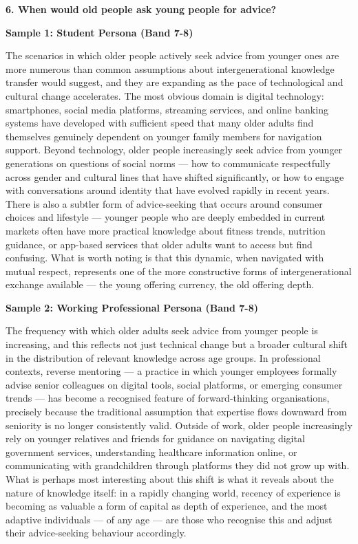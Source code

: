 \separator

\begin{ieltsquestion}
\textbf{6. When would old people ask young people for advice?}
\end{ieltsquestion}
\textbf{Sample 1: Student Persona (Band 7-8)}

The scenarios in which older people actively seek advice from younger ones are more numerous than common assumptions about intergenerational knowledge transfer would suggest, and they are expanding as the pace of technological and cultural change accelerates. The most obvious domain is digital technology: smartphones, social media platforms, streaming services, and online banking systems have developed with sufficient speed that many older adults find themselves genuinely dependent on younger family members for navigation support. Beyond technology, older people increasingly seek advice from younger generations on questions of social norms — how to communicate respectfully across gender and cultural lines that have shifted significantly, or how to engage with conversations around identity that have evolved rapidly in recent years. There is also a subtler form of advice-seeking that occurs around consumer choices and lifestyle — younger people who are deeply embedded in current markets often have more practical knowledge about fitness trends, nutrition guidance, or app-based services that older adults want to access but find confusing. What is worth noting is that this dynamic, when navigated with mutual respect, represents one of the more constructive forms of intergenerational exchange available — the young offering currency, the old offering depth.

\textbf{Sample 2: Working Professional Persona (Band 7-8)}

The frequency with which older adults seek advice from younger people is increasing, and this reflects not just technical change but a broader cultural shift in the distribution of relevant knowledge across age groups. In professional contexts, reverse mentoring — a practice in which younger employees formally advise senior colleagues on digital tools, social platforms, or emerging consumer trends — has become a recognised feature of forward-thinking organisations, precisely because the traditional assumption that expertise flows downward from seniority is no longer consistently valid. Outside of work, older people increasingly rely on younger relatives and friends for guidance on navigating digital government services, understanding healthcare information online, or communicating with grandchildren through platforms they did not grow up with. What is perhaps most interesting about this shift is what it reveals about the nature of knowledge itself: in a rapidly changing world, recency of experience is becoming as valuable a form of capital as depth of experience, and the most adaptive individuals — of any age — are those who recognise this and adjust their advice-seeking behaviour accordingly.

